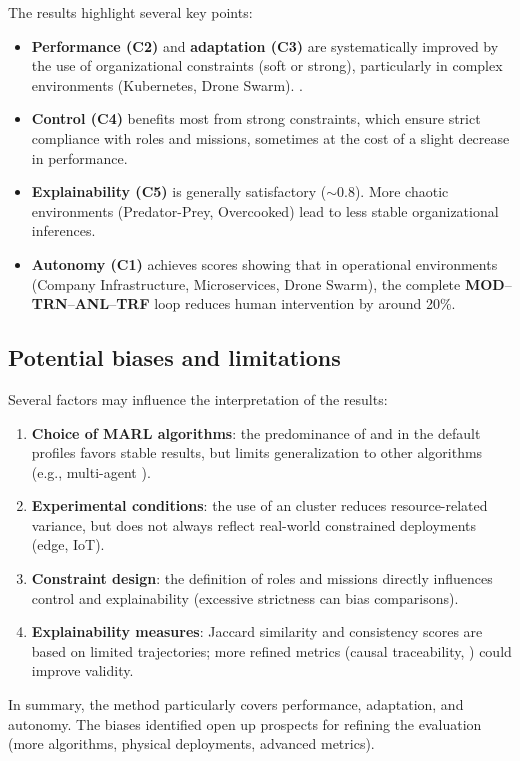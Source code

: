 The results highlight several key points:
\begin{itemize}
\item \textbf{Performance (C2)} and \textbf{adaptation (C3)} are systematically improved by the use of organizational constraints (soft or strong), particularly in complex environments (Kubernetes, Drone Swarm).
.
\item \textbf{Control (C4)} benefits most from strong constraints, which ensure strict compliance with roles and missions, sometimes at the cost of a slight decrease in performance.
\item \textbf{Explainability (C5)} is generally satisfactory ($\sim 0.8$). More chaotic environments (Predator-Prey, Overcooked) lead to less stable organizational inferences.
\item \textbf{Autonomy (C1)} achieves scores showing that in operational environments (Company Infrastructure, Microservices, Drone Swarm), the complete \textbf{MOD}–\textbf{TRN}–\textbf{ANL}–\textbf{TRF} loop reduces human intervention by around 20\%.
\end {itemize}

\subsection{Potential biases and limitations}

Several factors may influence the interpretation of the results:
\begin{enumerate}[label={\alph*)}]
  \item \textbf{Choice of MARL algorithms}: the predominance of  and  in the default profiles favors stable results, but limits generalization to other algorithms (e.g., multi-agent ).
  \item \textbf{Experimental conditions}: the use of an  cluster reduces resource-related variance, but does not always reflect real-world constrained deployments (edge, IoT).
  \item \textbf{Constraint design}: the definition of roles and missions directly influences control and explainability (excessive strictness can bias comparisons).
  \item \textbf{Explainability measures}: Jaccard similarity and consistency scores are based on limited trajectories; more refined metrics (causal traceability, ) could improve validity.
\end{enumerate}

\medskip
In summary, the  method particularly covers performance, adaptation, and autonomy. The biases identified open up prospects for refining the evaluation (more algorithms, physical deployments, advanced metrics).

